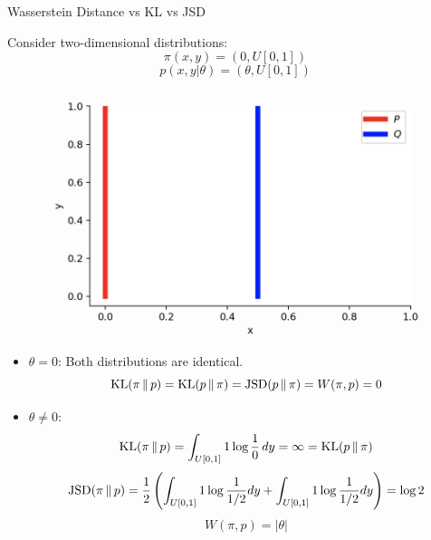 \documentclass{beamer}
\begin{document}
\begin{frame}{Wasserstein Distance vs KL vs JSD}
	\begin{minipage}[t]{0.48\columnwidth}
		Consider two-dimensional distributions:
		\vspace{-0.3cm}
		\[
			\pi(x, y) = (0, U[0, 1])
		\]	
		\[
			p(x, y | \theta) = (\theta, U[0, 1])
		\]
	\end{minipage}%
	\begin{minipage}[t]{0.52\columnwidth}
		\vspace{-0.3cm}
		\begin{figure}
			\centering
			\includegraphics[width=0.8\linewidth]{figs/w_kl_jsd}
		\end{figure}
	\end{minipage}
	\eqpause
	\begin{itemize}
		\footnotesize
		\item $\theta = 0$: Both distributions are identical.
		\[
			\mathrm{KL}(\pi\,\|\,p) = \mathrm{KL}(p\,\|\,\pi) = \mathrm{JSD}(p\,\|\,\pi) = W(\pi, p) = 0
		\]
		\vspace{-0.5cm}
		\eqpause
		\item $\theta \neq 0$:
		\[
			\mathrm{KL}(\pi\,\|\,p) = \int_{U[0, 1]} 1 \log \frac{1}{0}\,dy = \infty = \mathrm{KL}(p\,\|\,\pi)
		\]
		\eqpause
		\[
			\mathrm{JSD}(\pi\,\|\,p) = \frac{1}{2}\left( \int_{U[0, 1]}1 \log \frac{1}{1/2} dy + \int_{U[0, 1]}1 \log \frac{1}{1/2} dy \right) = \log 2
		\]
		\eqpause
		\[
			W(\pi, p) = |\theta|
		\]
	\end{itemize}
\end{frame}
\end{document}
